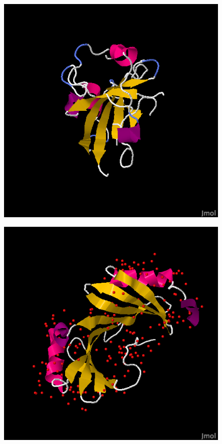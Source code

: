 \documentclass{article}
\begin{document}
\begin{figure}
\centering
\begin{minipage}{.5\textwidth}
  \centering
  \includegraphics[width=.9\linewidth]{target_group}
  \label{fig:test1}
\end{minipage}%
\begin{minipage}{.5\textwidth}
  \centering
  \includegraphics[width=.9\linewidth]{target_native}
  \label{fig:test2}
\end{minipage}
\end{figure}
\end{document}
